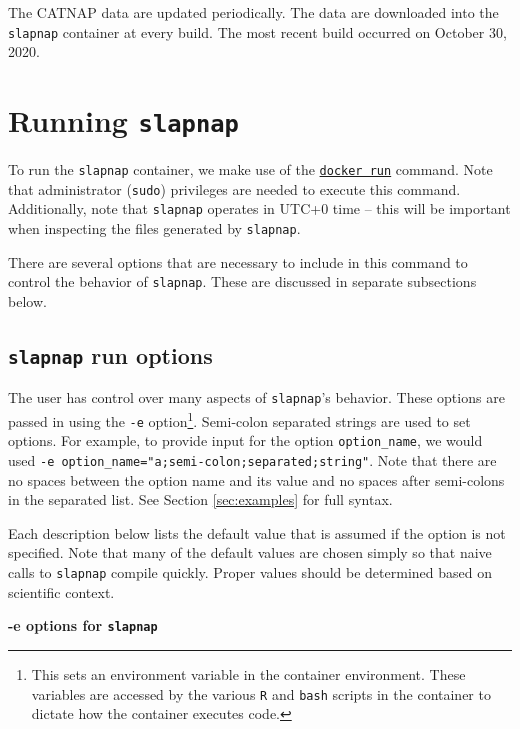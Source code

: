 \documentclass[]{article}
\begin{document}
The CATNAP data are updated periodically. The data are downloaded into
the \texttt{slapnap} container at every build. The most recent build
occurred on October 30, 2020.

\section{\texorpdfstring{Running
\texttt{slapnap}}{Running slapnap}}\label{sec:runningcontainer}

To run the \texttt{slapnap} container, we make use of the
\href{https://docs.docker.com/engine/reference/run/}{\texttt{docker\ run}}
command. Note that administrator (\texttt{sudo}) privileges are needed
to execute this command. Additionally, note that \texttt{slapnap}
operates in UTC+0 time -- this will be important when inspecting the
files generated by \texttt{slapnap}.

There are several options that are necessary to include in this command
to control the behavior of \texttt{slapnap}. These are discussed in
separate subsections below.

\subsection{\texorpdfstring{\texttt{slapnap} run
options}{slapnap run options}}\label{sec:opts}

The user has control over many aspects of \texttt{slapnap}'s behavior.
These options are passed in using the \texttt{-e} option\footnote{This
  sets an environment variable in the container environment. These
  variables are accessed by the various \texttt{R} and \texttt{bash}
  scripts in the container to dictate how the container executes code.}.
Semi-colon separated strings are used to set options. For example, to
provide input for the option \texttt{option\_name}, we would used
\texttt{-e\ option\_name="a;semi-colon;separated;string"}. Note that
there are no spaces between the option name and its value and no spaces
after semi-colons in the separated list. See Section \ref{sec:examples}
for full syntax.

Each description below lists the default value that is assumed if the
option is not specified. Note that many of the default values are chosen
simply so that naive calls to \texttt{slapnap} compile quickly. Proper
values should be determined based on scientific context.

\textbf{-e options for \texttt{slapnap}}
\end{document}
